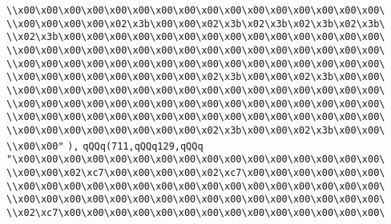 \verb|\\x00\x00\x00\x00\x00\x00\x00\x00\x00\x00\x00\x00\x00\x00\x00\x00\|\newline
\verb|\\x00\x00\x00\x00\x02\x3b\x00\x00\x02\x3b\x02\x3b\x02\x3b\x02\x3b\|\newline
\verb|\\x02\x3b\x00\x00\x00\x00\x00\x00\x00\x00\x00\x00\x00\x00\x00\x00\|\newline
\verb|\\x00\x00\x00\x00\x00\x00\x00\x00\x00\x00\x00\x00\x00\x00\x00\x00\|\newline
\verb|\\x00\x00\x00\x00\x00\x00\x00\x00\x00\x00\x00\x00\x00\x00\x00\x00\|\newline
\verb|\\x00\x00\x00\x00\x00\x00\x00\x00\x02\x3b\x00\x00\x02\x3b\x00\x00\|\newline
\verb|\\x00\x00\x00\x00\x00\x00\x00\x00\x00\x00\x00\x00\x00\x00\x00\x00\|\newline
\verb|\\x00\x00\x00\x00\x00\x00\x00\x00\x00\x00\x00\x00\x00\x00\x00\x00\|\newline
\verb|\\x00\x00\x00\x00\x00\x00\x00\x00\x00\x00\x00\x00\x00\x00\x00\x00\|\newline
\verb|\\x00\x00\x00\x00\x00\x00\x00\x00\x02\x3b\x00\x00\x02\x3b\x00\x00\|\newline
\verb|\\x00\x00"|\newline
\verb|),|\newline
\verb|qQQq(711,qQQq129,qQQq|\newline
\verb|"\x00\x00\x00\x00\x00\x00\x00\x00\x00\x00\x00\x00\x00\x00\x00\x00\|\newline
\verb|\\x00\x00\x02\xc7\x00\x00\x00\x00\x02\xc7\x00\x00\x00\x00\x00\x00\|\newline
\verb|\\x00\x00\x00\x00\x00\x00\x00\x00\x00\x00\x00\x00\x00\x00\x00\x00\|\newline
\verb|\\x00\x00\x00\x00\x00\x00\x00\x00\x00\x00\x00\x00\x00\x00\x00\x00\|\newline
\verb|\\x02\xc7\x00\x00\x00\x00\x00\x00\x00\x00\x00\x00\x00\x00\x00\x00\|\newline
